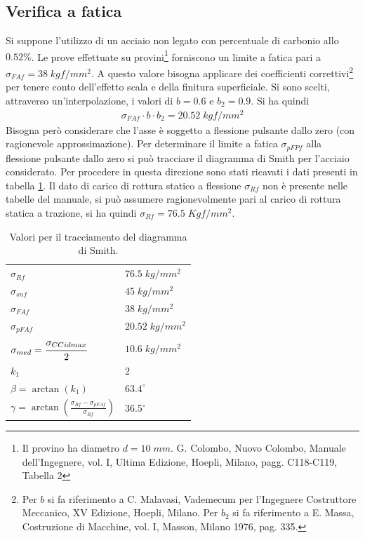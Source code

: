 \subsection{Verifica a fatica}
Si suppone l'utilizzo di un acciaio non legato con percentuale di carbonio allo $0.52\%$.
Le prove effettuate su provini\footnote{Il provino ha diametro $d=10\; mm$. G. Colombo, Nuovo Colombo, Manuale dell’Ingegnere,
vol. I, Ultima Edizione, Hoepli, Milano, pagg. C118-C119, Tabella 2} forniscono un limite a fatica pari a $\sigma_{FAf}= 38 \; kgf/mm^2$. 
A questo valore bisogna applicare dei coefficienti correttivi\footnote{Per $b$ si fa riferimento a C. Malavasi, Vademecum per l’Ingegnere Costruttore Meccanico, XV Edizione, Hoepli, Milano. Per $b_2$ si fa riferimento a E. Massa, Costruzione di Macchine, vol. I, Masson, Milano 1976, pag. 335.} per tenere conto dell'effetto scala e della finitura superficiale. 
Si sono scelti, attraverso un'interpolazione, i valori di $b=0.6$ e $b_2=0.9$.
Si ha quindi 
\begin{align*}
\sigma_{FAf} \cdot b \cdot b_2= 20.52 \; kgf/mm^2
\end{align*}
Bisogna però considerare che l'asse è soggetto a flessione pulsante dallo zero (con ragionevole approssimazione). 
Per determinare il limite a fatica $\sigma_{pFPf}$ alla flessione pulsante dallo zero si può tracciare il diagramma di Smith per l'acciaio considerato. 
Per procedere in questa direzione sono stati ricavati i dati presenti in tabella \ref{tab:smith}. Il dato di carico di rottura statico a flessione $\sigma_{Rf}$ non è presente nelle tabelle del manuale, si può assumere ragionevolmente pari al carico di rottura statica a trazione, si ha quindi $\sigma_{Rf} = 76.5 \; Kgf/mm^2$. 
\begin{table}[H]
\centering
\begin{tabular}{ll}
\toprule
$\sigma_{Rf}$                              & $76.5\;kg/mm^2$ \\
$\sigma_{snf}$                             & $45\;kg/mm^2$   \\
$\sigma_{FAf}$                             & $38\;kg/mm^2$   \\
$\sigma_{pFAf}$                            & $20.52\;kg/mm^2$ \\
$\sigma_{med}= \cfrac{\sigma_{CCidmax}}{2}$ & $10.6\;kg/mm^2$ \\
$k_1$                                      & $2$             \\
$\beta=\arctan (k_1)$                      & $63.4^{\circ}$  \\
$\gamma = \arctan \left(\frac{\sigma_{Rf} - \sigma_{pFAf}}{\sigma_{Rf}}\right)$                                   & $36.5^{\circ}$ \\
\bottomrule
\end{tabular}
\caption{Valori per il tracciamento del diagramma di Smith.}
\label{tab:smith}
\end{table}
